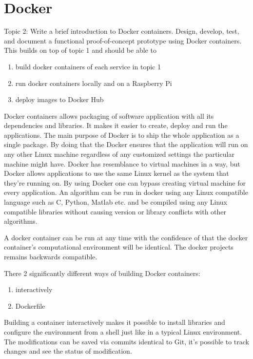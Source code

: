 \chapter{Docker}\label{ch:docker}
Topic 2: Write a brief introduction to Docker containers.  Design, develop, test, and document a functional proof-of-concept prototype using Docker containers. This builds on top of topic 1 and should be able to

\begin{enumerate}
\item build docker containers of each service in topic 1
\item run docker containers locally and on a Raspberry Pi
\item deploy images to Docker Hub
\end{enumerate} 

Docker containers allows packaging of software application with all its dependencies and libraries. It makes it easier to create, deploy and run the applications. The main purpose of Docker is to ship the whole application as a single package. 
By doing that the Docker ensures that the application will run on any other Linux machine regardless of any customized settings the particular machine might have.
Docker has resemblance to virtual machines in a way, but Docker allows applications to use the same Linux kernel as the system that they’re running on. By using Docker one can bypass creating virtual machine for every application. 
An algorithm can be run in docker using any Linux compatible language such as C, Python, Matlab etc. and be compiled using any Linux compatible libraries without causing version or library conflicts with other algorithms.



A docker container can be run at any time with the confidence of that the docker container’s computational environment will be identical. The docker projects remains backwards compatible. 


There 2 significantly different ways of building Docker containers:

\begin{enumerate}
	\item interactively
	\item Dockerfile
\end{enumerate} 

Building a container interactively makes it possible to install libraries and configure the environment from a shell just like in a typical Linux environment. The modifications can be saved via commits identical to Git, it’s possible to track changes and see the status of modification.  

